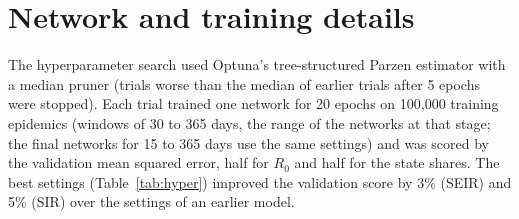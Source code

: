 \documentclass[12pt]{article}
\begin{document}
\section{Network and training details}\label{app:training}

\begin{table}[htbp]
\centering
\caption{Settings of the two DeepIMC models. The search space of the hyperparameter search is given in
brackets.}
\label{tab:hyper}
\small
{}
\end{table}

The hyperparameter search used Optuna's tree-structured Parzen estimator with a median pruner (trials worse
than the median of earlier trials after 5 epochs were stopped). Each trial trained one network for 20 epochs
on 100,000 training epidemics (windows of 30 to 365 days, the range of the networks at that stage; the final
networks for 15 to 365 days use the same settings) and was scored by the validation mean squared error, half for
$R_0$ and half
for the state shares. The best settings (Table~\ref{tab:hyper}) improved the validation score by 3\% (SEIR)
and 5\% (SIR) over the settings of an earlier model.
\end{document}
